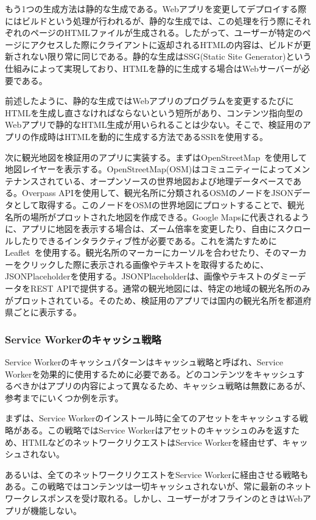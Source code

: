 もう1つの生成方法は静的な生成である。Webアプリを変更してデプロイする際にはビルドという処理が行われるが、静的な生成では、この処理を行う際にそれぞれのページのHTMLファイルが生成される。したがって、ユーザーが特定のページにアクセスした際にクライアントに返却されるHTMLの内容は、ビルドが更新されない限り常に同じである。静的な生成はSSG(Static Site Generator)という仕組みによって実現しており、HTMLを静的に生成する場合はWebサーバーが必要である。

前述したように、静的な生成ではWebアプリのプログラムを変更するたびにHTMLを生成し直さなければならないという短所があり、コンテンツ指向型のWebアプリで静的なHTML生成が用いられることは少ない。そこで、検証用のアプリの作成時はHTMLを動的に生成する方法であるSSRを使用する。

次に観光地図を検証用のアプリに実装する。まずはOpenStreetMap~\cite{OpenStreetMap}を使用して地図レイヤーを表示する。OpenStreetMap(OSM)はコミュニティーによってメンテナンスされている、オープンソースの世界地図および地理データベースである。Overpass APIを使用して、観光名所に分類されるOSMのノードをJSONデータとして取得する。このノードをOSMの世界地図にプロットすることで、観光名所の場所がプロットされた地図を作成できる。Google Mapsに代表されるように、アプリに地図を表示する場合は、ズーム倍率を変更したり、自由にスクロールしたりできるインタラクティブ性が必要である。これを満たすためにLeaflet~\cite{Leaflet}を使用する。観光名所のマーカーにカーソルを合わせたり、そのマーカーをクリックした際に表示される画像やテキストを取得するために、JSONPlaceholderを使用する。JSONPlaceholderは、画像やテキストのダミーデータをREST APIで提供する。通常の観光地図には、特定の地域の観光名所のみがプロットされている。そのため、検証用のアプリでは国内の観光名所を都道府県ごとに表示する。
\subsubsection{Service Workerのキャッシュ戦略}
\label{Service Workerのキャッシュパターン}
Service Workerのキャッシュパターンはキャッシュ戦略と呼ばれ、Service Workerを効果的に使用するために必要である。どのコンテンツをキャッシュするべきかはアプリの内容によって異なるため、キャッシュ戦略は無数にあるが、参考までにいくつか例を示す。

まずは、Service Workerのインストール時に全てのアセットをキャッシュする戦略がある。この戦略ではService Workerはアセットのキャッシュのみを返すため、HTMLなどのネットワークリクエストはService Workerを経由せず、キャッシュされない。

あるいは、全てのネットワークリクエストをService Workerに経由させる戦略もある。この戦略ではコンテンツは一切キャッシュされないが、常に最新のネットワークレスポンスを受け取れる。しかし、ユーザーがオフラインのときはWebアプリが機能しない。

